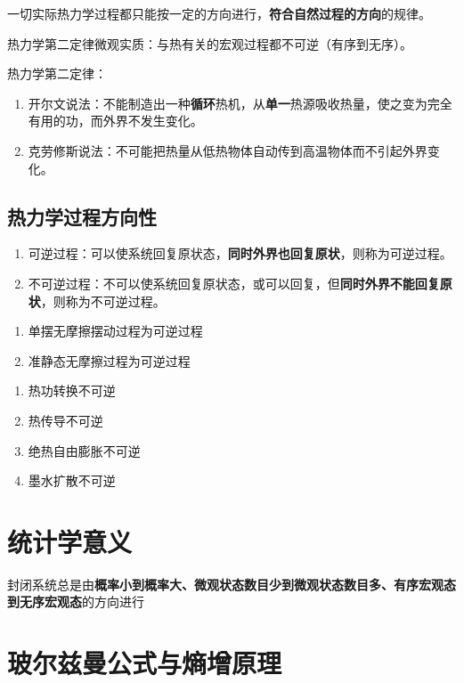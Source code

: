 一切实际热力学过程都只能按一定的方向进行，\textbf{符合自然过程的方向}的规律。

热力学第二定律微观实质：与热有关的宏观过程都不可逆（有序到无序）。

热力学第二定律：\begin{enumerate}
    \item 开尔文说法：不能制造出一种\textbf{循环}热机，从\textbf{单一}热源吸收热量，使之变为完全有用的功，而外界不发生变化。
    \item 克劳修斯说法：不可能把热量从低热物体自动传到高温物体而不引起外界变化。
\end{enumerate}

\subsection{热力学过程方向性}

\begin{enumerate}
    \item 可逆过程：可以使系统回复原状态，\textbf{同时外界也回复原状}，则称为可逆过程。
    \item 不可逆过程：不可以使系统回复原状态，或可以回复，但\textbf{同时外界不能回复原状}，则称为不可逆过程。
\end{enumerate}

\begin{enumerate}
    \item 单摆无摩擦摆动过程为可逆过程
    \item 准静态无摩擦过程为可逆过程
\end{enumerate}

\begin{enumerate}
    \item 热功转换不可逆
    \item 热传导不可逆
    \item 绝热自由膨胀不可逆
    \item 墨水扩散不可逆
\end{enumerate}

\section{统计学意义}

封闭系统总是由\textbf{概率小到概率大、微观状态数目少到微观状态数目多、有序宏观态到无序宏观态}的方向进行

\section{玻尔兹曼公式与熵增原理}

